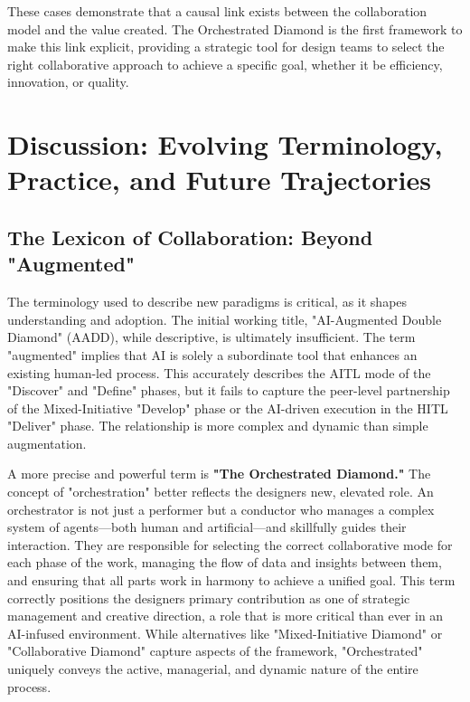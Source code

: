 \documentclass[
  12pt,
  a4paper,
  bibliography=totoc,
  numbers=noenddot
]{scrartcl}
\begin{document}
These cases demonstrate that a causal link exists between the
collaboration model and the value created. The Orchestrated Diamond is
the first framework to make this link explicit, providing a strategic
tool for design teams to select the right collaborative approach to
achieve a specific goal, whether it be efficiency, innovation, or
quality.

\section{Discussion: Evolving
Terminology, Practice, and Future
Trajectories}\label{section-6-discussion-evolving-terminology-practice-and-future-trajectories}

\subsection{The Lexicon of Collaboration:
Beyond
"Augmented"}\label{the-lexicon-of-collaboration-beyond-augmented}

The terminology used to describe new paradigms is critical, as it shapes
understanding and adoption. The initial working title, "AI-Augmented
Double Diamond" (AADD), while descriptive, is ultimately insufficient.
The term "augmented" implies that AI is solely a subordinate tool that
enhances an existing human-led process. This accurately describes the
AITL mode of the "Discover" and "Define" phases, but it fails to capture
the peer-level partnership of the Mixed-Initiative "Develop" phase or
the AI-driven execution in the HITL "Deliver" phase. The relationship is
more complex and dynamic than simple augmentation.

A more precise and powerful term is \textbf{"The Orchestrated Diamond."}
The concept of "orchestration" better reflects the
designer\textquotesingle s new, elevated role.\cite{uxdesign2025why} An
orchestrator is not just a performer but a conductor who manages a
complex system of agents---both human and artificial---and skillfully
guides their interaction. They are responsible for selecting the correct
collaborative mode for each phase of the work, managing the flow of data
and insights between them, and ensuring that all parts work in harmony
to achieve a unified goal.\cite{uxdesign2025why} This term correctly
positions the designer\textquotesingle s primary contribution as one of
strategic management and creative direction, a role that is more
critical than ever in an AI-infused environment. While alternatives like
"Mixed-Initiative Diamond" or "Collaborative Diamond" capture aspects of
the framework, "Orchestrated" uniquely conveys the active, managerial,
and dynamic nature of the entire process.
\end{document}
